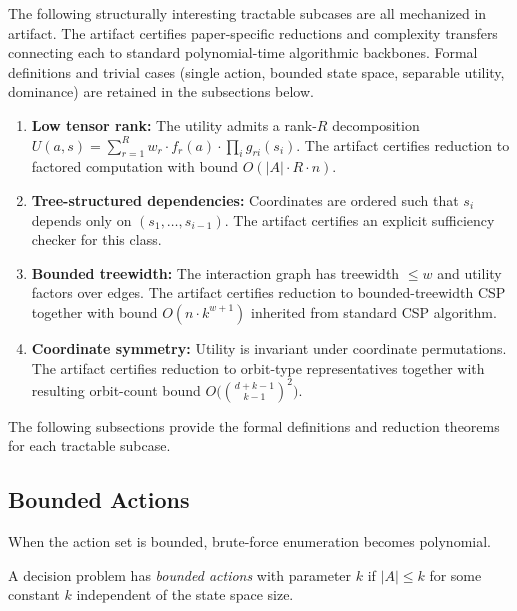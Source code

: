 \begin{theorem}\label{thm:tractable}
The following structurally interesting tractable subcases are all mechanized in artifact. The artifact certifies paper-specific reductions and complexity transfers connecting each to standard polynomial-time algorithmic backbones. Formal definitions and trivial cases (single action, bounded state space, separable utility, dominance) are retained in the subsections below.
\begin{enumerate}
\item \textbf{Low tensor rank:} The utility admits a rank-$R$ decomposition $U(a,s) = \sum_{r=1}^R w_r \cdot f_r(a) \cdot \prod_i g_{ri}(s_i)$. The artifact certifies reduction to factored computation with bound $O(|A| \cdot R \cdot n)$. 
\item \textbf{Tree-structured dependencies:} Coordinates are ordered such that $s_i$ depends only on $(s_1,\ldots, s_{i-1})$. The artifact certifies an explicit sufficiency checker for this class. 
\item \textbf{Bounded treewidth:} The interaction graph has treewidth $\le w$ and utility factors over edges. The artifact certifies reduction to bounded-treewidth CSP together with bound $O(n \cdot k^{w+1})$ inherited from standard CSP algorithm. 
\item \textbf{Coordinate symmetry:} Utility is invariant under coordinate permutations. The artifact certifies reduction to orbit-type representatives together with resulting orbit-count bound $O\bigl(\binom{d+k-1}{k-1}^2\bigr)$. 
\end{enumerate}
\end{theorem}

The following subsections provide the formal definitions and reduction theorems for each tractable subcase.

\subsection{Bounded Actions}\label{sec:tract-bounded}

When the action set is bounded, brute-force enumeration becomes polynomial.

\begin{definition}
A decision problem has \emph{bounded actions} with parameter $k$ if $|A| \leq k$ for some constant $k$ independent of the state space size.
\end{definition}

